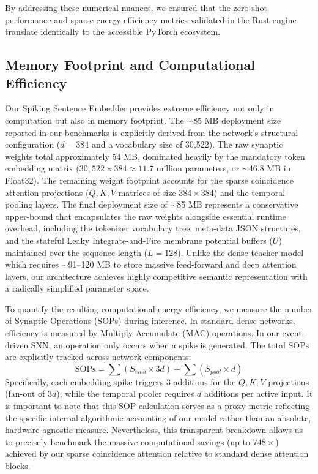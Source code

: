 \documentclass{article} %
\begin{document}
By addressing these numerical nuances, we ensured that the zero-shot performance and sparse energy efficiency metrics validated in the Rust engine translate identically to the accessible PyTorch ecosystem.

\subsection{Memory Footprint and Computational Efficiency}
Our Spiking Sentence Embedder provides extreme efficiency not only in computation but also in memory footprint. The $\sim$85 MB deployment size reported in our benchmarks is explicitly derived from the network's structural configuration ($d=384$ and a vocabulary size of 30,522). The raw synaptic weights total approximately 54 MB, dominated heavily by the mandatory token embedding matrix ($30,522 \times 384 \approx 11.7$ million parameters, or $\sim$46.8 MB in Float32). The remaining weight footprint accounts for the sparse coincidence attention projections ($Q, K, V$ matrices of size $384 \times 384$) and the temporal pooling layers. The final deployment size of $\sim$85 MB represents a conservative upper-bound that encapsulates the raw weights alongside essential runtime overhead, including the tokenizer vocabulary tree, meta-data JSON structures, and the stateful Leaky Integrate-and-Fire membrane potential buffers ($U$) maintained over the sequence length ($L=128$). Unlike the dense teacher model which requires $\sim$91--120 MB to store massive feed-forward and deep attention layers, our architecture achieves highly competitive semantic representation with a radically simplified parameter space.

To quantify the resulting computational energy efficiency, we measure the number of Synaptic Operations (SOPs) during inference. In standard dense networks, efficiency is measured by Multiply-Accumulate (MAC) operations. In our event-driven SNN, an operation only occurs when a spike is generated. The total SOPs are explicitly tracked across network components:
\begin{equation}
\text{SOPs} = \sum \left( S_{emb} \times 3d \right) + \sum \left( S_{pool} \times d \right)
\end{equation}
Specifically, each embedding spike triggers 3 additions for the $Q, K, V$ projections (fan-out of $3d$), while the temporal pooler requires $d$ additions per active input. It is important to note that this SOP calculation serves as a proxy metric reflecting the specific internal algorithmic accounting of our model rather than an absolute, hardware-agnostic measure. Nevertheless, this transparent breakdown allows us to precisely benchmark the massive computational savings (up to $748\times$) achieved by our sparse coincidence attention relative to standard dense attention blocks.
\end{document}

